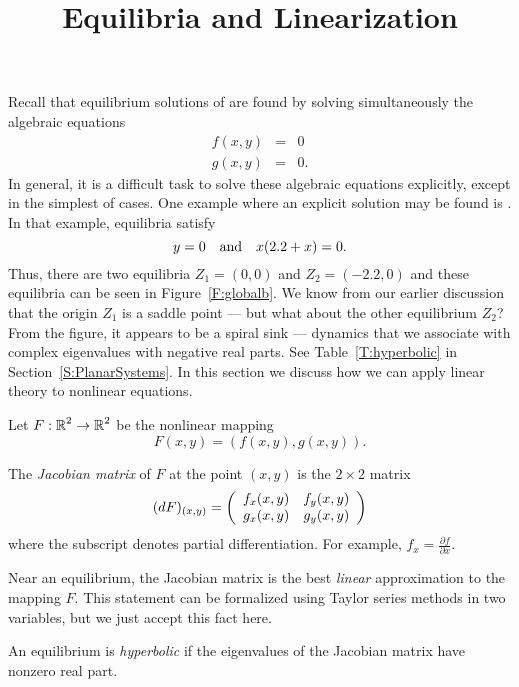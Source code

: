 \documentclass{ximera}
\title{Equilibria and Linearization}
\begin{document}
\begin{abstract}
\end{abstract}
\maketitle

 \label{S:linearization}
  

Recall that equilibrium solutions of 
are found by solving simultaneously the algebraic equations
\begin{equation}
\begin{array}{rcl} 
f(x,y) & = & 0 \\
g(x,y) & = & 0.
\end{array}
\end{equation}
In general, it is a difficult task to solve these algebraic
equations explicitly, except in the simplest of cases. One
example where an explicit solution may be found is
.  In that example, equilibria satisfy
\[
y  =  0 \quad\mbox{and}\quad x(2.2+x) = 0.
\]
Thus, there are two equilibria $Z_1=(0,0)$ and $Z_2=(-2.2,0)$
and these equilibria can be seen in Figure~\ref{F:globalb}.  We
know from our earlier discussion that the origin $Z_1$ is a
saddle point --- but what about the other equilibrium $Z_2$?
From the figure, it appears to be a spiral sink --- dynamics
that we associate with complex eigenvalues with negative real
parts.  See Table~\ref{T:hyperbolic} in Section~\ref{S:PlanarSystems}.  
In this section we discuss how we can apply linear theory to 
nonlinear equations. 

Let $F:\mbox{$\Bbb{R}$}^2\to\mbox{$\Bbb{R}$}^2$ be the nonlinear mapping 
\[
F(x,y)=(f(x,y),g(x,y)).
\]
\begin{definition}  \label{D:Jacobian}
The {\em Jacobian matrix} 
 of $F$ at the point 
$(x,y)$ is the $2\times 2$ matrix 
\begin{equation}  \label{e:jacobian}
(dF)_{(x,y)} = \left(\begin{array}{rr} f_x(x,y) & f_y(x,y)\\ g_x(x,y) &g_y(x,y)\end{array}\right)
\end{equation}
where the subscript denotes partial differentiation.  For example, 
$f_x=\frac{\partial f}{\partial x}$.
\end{definition}

Near an equilibrium, the Jacobian matrix is the best {\em linear\/}
approximation to the mapping $F$.  
This statement can be formalized using 
Taylor series methods in two variables, but we just accept this fact here. 
\begin{definition}  \label{D:hyperbolic}
An equilibrium is {\em hyperbolic\/} if the eigenvalues of the 
Jacobian matrix have nonzero real part. 
\end{definition} 
\end{document}
